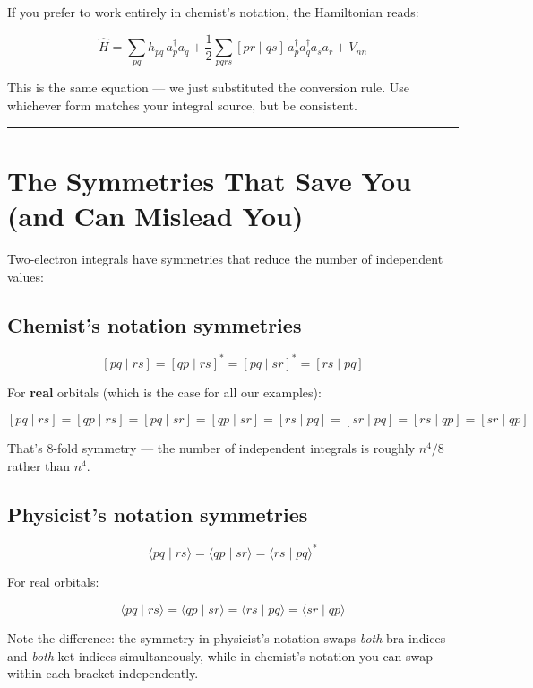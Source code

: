 \documentclass[
  11pt,
  oneside]{book}
\begin{document}
If you prefer to work entirely in chemist's notation, the Hamiltonian
reads:

\[\hat{H} = \sum_{pq} h_{pq}\, a_p^\dagger a_q + \frac{1}{2}\sum_{pqrs} [pr \mid qs]\, a_p^\dagger a_q^\dagger a_s a_r + V_{nn}\]

This is the same equation --- we just substituted the conversion rule.
Use whichever form matches your integral source, but be consistent.

\begin{center}\rule{0.5\linewidth}{0.5pt}\end{center}

\section{The Symmetries That Save You (and Can Mislead
You)}\label{the-symmetries-that-save-you-and-can-mislead-you}

Two-electron integrals have symmetries that reduce the number of
independent values:

\subsection{Chemist's notation
symmetries}\label{chemists-notation-symmetries}

\[[pq \mid rs] = [qp \mid rs]^* = [pq \mid sr]^* = [rs \mid pq]\]

For \textbf{real} orbitals (which is the case for all our examples):

\[[pq \mid rs] = [qp \mid rs] = [pq \mid sr] = [qp \mid sr] = [rs \mid pq] = [sr \mid pq] = [rs \mid qp] = [sr \mid qp]\]

That's 8-fold symmetry --- the number of independent integrals is
roughly \(n^4/8\) rather than \(n^4\).

\subsection{Physicist's notation
symmetries}\label{physicists-notation-symmetries}

\[\langle pq \mid rs\rangle = \langle qp \mid sr\rangle = \langle rs \mid pq\rangle^*\]

For real orbitals:

\[\langle pq \mid rs\rangle = \langle qp \mid sr\rangle = \langle rs \mid pq\rangle = \langle sr \mid qp\rangle\]

Note the difference: the symmetry in physicist's notation swaps
\emph{both} bra indices and \emph{both} ket indices simultaneously,
while in chemist's notation you can swap within each bracket
independently.
\end{document}
